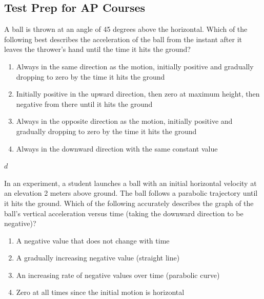 \documentclass[
]{book}
\providecommand{\tightlist}{%
  \setlength{\itemsep}{0pt}\setlength{\parskip}{0pt}}
\newenvironment{ap-test-prep}{}{}
\begin{document}
\hypertarget{fs-id1817678}{}
\begin{ap-test-prep}

\hypertarget{test-prep-for-ap-courses-6}{%
\subsection{Test Prep for AP Courses}\label{test-prep-for-ap-courses-6}}

\hypertarget{fs-id1421044}{}
\leavevmode\hypertarget{fs-id1309259}{}%
A ball is thrown at an angle of 45 degrees above the horizontal. Which
of the following best describes the acceleration of the ball from the
instant after it leaves the thrower's hand until the time it hits the
ground?

\begin{enumerate}
\def\labelenumi{\alph{enumi}.}
\tightlist
\item
  Always in the same direction as the motion, initially positive and
  gradually dropping to zero by the time it hits the ground
\item
  Initially positive in the upward direction, then zero at maximum
  height, then negative from there until it hits the ground
\item
  Always in the opposite direction as the motion, initially positive
  and gradually dropping to zero by the time it hits the ground
\item
  Always in the downward direction with the same constant value
\end{enumerate}

\leavevmode\hypertarget{fs-id1683193}{}%
\(d\)

\hypertarget{fs-id895568}{}
\leavevmode\hypertarget{fs-id1488718}{}%
In an experiment, a student launches a ball with an initial horizontal
velocity at an elevation 2 meters above ground. The ball follows a
parabolic trajectory until it hits the ground. Which of the following
accurately describes the graph of the ball's vertical acceleration
versus time (taking the downward direction to be negative)?

\begin{enumerate}
\def\labelenumi{\alph{enumi}.}
\tightlist
\item
  A negative value that does not change with time
\item
  A gradually increasing negative value (straight line)
\item
  An increasing rate of negative values over time (parabolic curve)
\item
  Zero at all times since the initial motion is horizontal
\end{enumerate}


\end{ap-test-prep}
\end{document}
